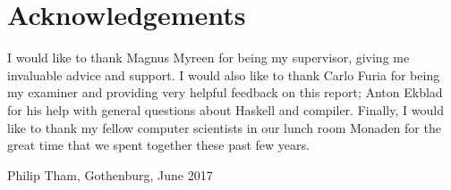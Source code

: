 \thispagestyle{plain}			%
\section*{Acknowledgements}
I would like to thank Magnus Myreen for being my supervisor,
giving me invaluable advice and support. I would also like to thank Carlo Furia
for being my examiner and providing very helpful feedback on this report;
Anton Ekblad for his help with general questions about  Haskell and compiler.
Finally, I would like to thank my fellow computer scientists in our lunch room
Monaden for the great time that we spent together these past few years.


\vspace{1.5cm}
\hfill
Philip Tham, Gothenburg, June 2017

\newpage				%
\thispagestyle{empty}
\mbox{}
